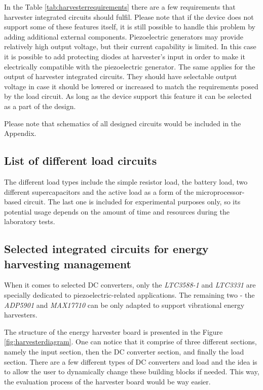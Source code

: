 \documentclass[12pt,a4paper]{article}
\begin{document}
In the Table \ref{tab:harvesterrequirements} there are a few requirements that harvester integrated circuits should fulfil. Please note that if the device does not support some of these features itself, it is still possible to handle this problem by adding additional external components. Piezoelectric generators may provide relatively high output voltage, but their current capability is limited. In this case it is possible to add protecting diodes at harvester's input in order to make it electrically compatible with the piezoelectric generator.
The same applies for the output of harvester integrated circuits. They should have selectable output voltage in case it should be lowered or increased to match the requirements posed by the load circuit. As long as the device support this feature it can be selected as a part of the design.
\par
Please note that schematics of all designed circuits would be included in the Appendix.

\subsection{List of different load circuits}
The different load types include the simple resistor load, the battery load, two different supercapacitors and the active load as a form of the microprocessor-based circuit. The last one is included for experimental purposes only, so its potential usage depends on the amount of time and resources during the laboratory tests.
\par

\subsection{Selected integrated circuits for energy harvesting management}
When it comes to selected DC converters, only the \textit{LTC3588-1} and \textit{LTC3331} are specially dedicated to piezoelectric-related applications. The remaining two - the \textit{ADP5901} and \textit{MAX17710} can be only adapted to support vibrational energy harvesters.
\par

The structure of the energy harvester board is presented in the Figure \ref{fig:harvesterdiagram}. One can notice that it comprise of three different sections, namely the input section, then the DC converter section, and finally the load section. There are a few different types of DC converters and load and the idea is to allow the user to dynamically change these building blocks if needed. This way, the evaluation process of the harvester board would be way easier.\par
\end{document}
